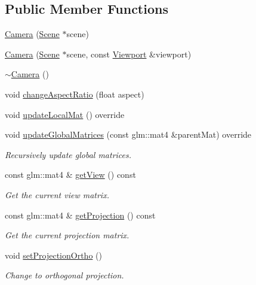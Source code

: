 \subsection*{Public Member Functions}
\begin{DoxyCompactItemize}
\item 
\mbox{\hyperlink{classec_1_1_camera_a5b8034c32e082171bdb61033781cdcc3}{Camera}} (\mbox{\hyperlink{classec_1_1_scene}{Scene}} $\ast$scene)
\item 
\mbox{\hyperlink{classec_1_1_camera_ab5fa55c91ae586754b613c3e8f33b31c}{Camera}} (\mbox{\hyperlink{classec_1_1_scene}{Scene}} $\ast$scene, const \mbox{\hyperlink{classec_1_1_viewport}{Viewport}} \&viewport)
\item 
\mbox{\hyperlink{classec_1_1_camera_a11d706554e37d6dde0b9313a445cbd4b}{$\sim$\+Camera}} ()
\item 
void \mbox{\hyperlink{classec_1_1_camera_ae66d4600de35284b8c6846e3dbd9c12d}{change\+Aspect\+Ratio}} (float aspect)
\item 
void \mbox{\hyperlink{classec_1_1_camera_acff95ac4ca039715d67c83111d03b8c1}{update\+Local\+Mat}} () override
\item 
void \mbox{\hyperlink{classec_1_1_camera_a1661dae4666cf50e697603904c96df6a}{update\+Global\+Matrices}} (const glm\+::mat4 \&parent\+Mat) override
\begin{DoxyCompactList}\small\item\em Recursively update global matrices. \end{DoxyCompactList}\item 
const glm\+::mat4 \& \mbox{\hyperlink{classec_1_1_camera_aa273a9bbe51bc00e8b0a35d8c79b0766}{get\+View}} () const
\begin{DoxyCompactList}\small\item\em Get the current view matrix. \end{DoxyCompactList}\item 
const glm\+::mat4 \& \mbox{\hyperlink{classec_1_1_camera_a5c245ceac5e710447b88a26a66dcc348}{get\+Projection}} () const
\begin{DoxyCompactList}\small\item\em Get the current projection matrix. \end{DoxyCompactList}\item 
void \mbox{\hyperlink{classec_1_1_camera_ae36280401efe1d0f5bef9997952f8814}{set\+Projection\+Ortho}} ()
\begin{DoxyCompactList}\small\item\em Change to orthogonal projection. \end{DoxyCompactList}\item 

\end{DoxyCompactItemize}
